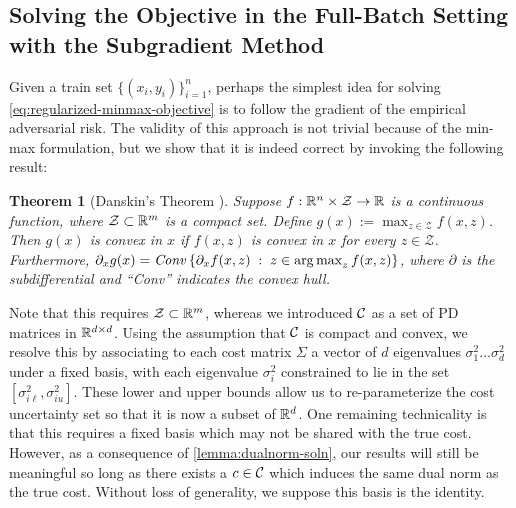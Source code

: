 \documentclass{article}
\newcommand{\costmatrix}{\Sigma}
\newcommand{\costset}{\gC}
\newcommand{\costfunc}{c}
\newcommand{\mincostscale}[1]{\sigma_{#1\ell}}
\newcommand{\maxcostscale}[1]{\sigma_{#1u}}
\newcommand{\cinc}{{\costfunc\in\costset}}
\newtheorem{theorem}{Theorem}[section]
\theoremstyle{definition}
\begin{document}
\subsection{Solving the Objective in the Full-Batch Setting with the Subgradient Method}
\label{sec:C-reparam}
Given a train set $\{(x_i, y_i)\}_{i=1}^n$, perhaps the simplest idea for solving \cref{eq:regularized-minmax-objective} is to follow the gradient of the empirical adversarial risk. The validity of this approach is not trivial because of the min-max formulation, but we show that it is indeed correct by invoking the following result:
\begin{theorem}[Danskin's Theorem \citep{bertsekas1997nonlinear}]
    Suppose $f : \mathbb{R}^n \times \mathcal{Z} \to \mathbb{R}$ is a continuous function, where $\mathcal{Z} \subset \mathbb{R}^m$ is a compact set. Define $g(x) := \max_{z\in\mathcal{Z}} f(x, z)$. Then $g(x)$ is convex in $x$ if $f(x, z)$ is convex in $x$ for every $z\in\mathcal{Z}$. Furthermore, $\partial_x g(x) = \textrm{\emph{Conv}}\left\{\partial_x f(x, z)\;:\; z\in\operatorname*{arg\,max}_z f(x, z) \right\}$, where $\partial$ is the subdifferential and ``\textrm{\emph{Conv}}'' indicates the convex hull. 
\end{theorem}
Note that this requires $\mathcal{Z}\subset \mathbb{R}^m$, whereas we introduced $\costset$ as a set of PD matrices in $\mathbb{R}^{d\times d}$.
Using the assumption that $\costset$ is compact and convex,
we resolve this by associating to each cost matrix $\costmatrix$ a vector of $d$ eigenvalues $\sigma_1^2\ldots \sigma_d^2$ under a fixed basis, with each eigenvalue $\sigma_i^2$ constrained to lie in the set $[\mincostscale{i}^2, \maxcostscale{i}^2]$. These lower and upper bounds allow us to re-parameterize the cost uncertainty set so that it is now a subset of $\mathbb{R}^d$. One remaining technicality is that this requires a fixed basis which may not be shared with the true cost. However, as a consequence of \cref{lemma:dualnorm-soln}, our results will still be meaningful so long as there exists a $\cinc$ which induces the same dual norm as the true cost. Without loss of generality, we suppose this basis is the identity.
\end{document}
